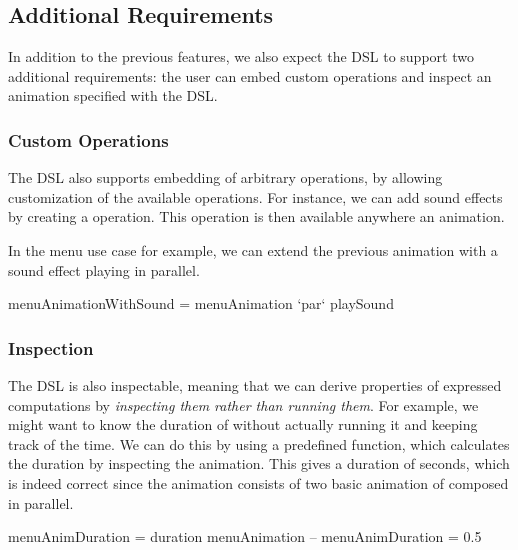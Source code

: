 \subsection{Additional Requirements}

In addition to the previous features, we also expect the DSL to support two additional requirements: the user can embed custom operations and inspect an animation specified with the DSL.

\subsubsection{Custom Operations}


The DSL also supports embedding of arbitrary operations, by allowing customization of the available operations. For instance, we can add sound effects by creating a  operation. This operation is then available anywhere an animation.

In the menu use case for example, we can extend the previous  animation with a sound effect playing in parallel.

\begin{code}
menuAnimationWithSound = menuAnimation `par` playSound
\end{code}

\subsubsection{Inspection}

The DSL is also inspectable, meaning that we can derive properties of expressed computations by \emph{inspecting them rather than running them}. For example, we might want to know the duration of  without actually running it and keeping track of the time. We can do this by using a predefined  function, which calculates the duration by inspecting the animation. This gives a duration of  seconds, which is indeed correct since the animation consists of two basic animation of  composed in parallel.

\begin{code}
menuAnimDuration = duration menuAnimation
-- menuAnimDuration = 0.5 
\end{code}

